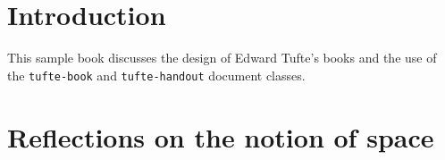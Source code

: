 \documentclass{tufte-book} %
\newcommand{\doccls}[1]{\texttt{#1}}
\numberwithin{dummy}{section}
\begin{document}

\tableofcontents %








\cleardoublepage
\chapter{Introduction} %

This sample book discusses the design of Edward Tufte's books\cite{Tufte2001,Tufte1990,Tufte1997,Tufte2006} and the use of the \doccls{tufte-book} and \doccls{tufte-handout} document classes.


\mainmatter

\chapter{Reflections on the notion of space}
\end{document}
